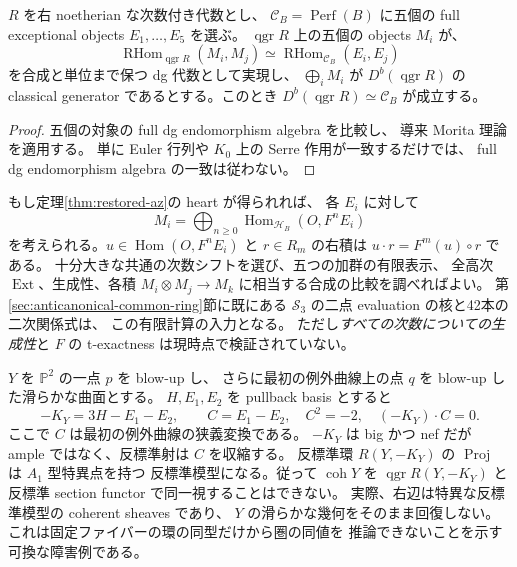 \begin{proposition}
$R$ を右 noetherian な次数付き代数とし、
$\mathcal C_B=\operatorname{Perf}(B)$ に五個の full exceptional objects
$E_1,\ldots,E_5$ を選ぶ。
$\operatorname{qgr}R$ 上の五個の objects $M_i$ が、
\[
\operatorname{RHom}_{\operatorname{qgr}R}(M_i,M_j)
 \simeq \operatorname{RHom}_{\mathcal C_B}(E_i,E_j)
\]
を合成と単位まで保つ dg 代数として実現し、
$\bigoplus_iM_i$ が $D^b(\operatorname{qgr}R)$ の classical generator
であるとする。このとき
$D^b(\operatorname{qgr}R)\simeq\mathcal C_B$ が成立する。
\end{proposition}
\begin{proof}
五個の対象の full dg endomorphism algebra を比較し、
導来 Morita 理論を適用する。
単に Euler 行列や $K_0$ 上の Serre 作用が一致するだけでは、
full dg endomorphism algebra の一致は従わない。
\end{proof}

\begin{remark}[再開時の有限入力]
もし定理\ref{thm:restored-az}の heart が得られれば、
各 $E_i$ に対して
\[
M_i=\bigoplus_{n\ge0}\operatorname{Hom}_{\mathcal H_B}(O,F^nE_i)
\]
を考えられる。$u\in\operatorname{Hom}(O,F^nE_i)$ と
$r\in R_m$ の右積は $u\cdot r=F^m(u)\circ r$ である。
十分大きな共通の次数シフトを選び、五つの加群の有限表示、
全高次 $\operatorname{Ext}$、生成性、各積 $M_i\otimes M_j\to M_k$
に相当する合成の比較を調べればよい。
第\ref{sec:anticanonical-common-ring}節に既にある
$\mathcal S_3$ の二点 evaluation の核と42本の二次関係式は、
この有限計算の入力となる。
ただし\emph{すべての次数についての生成性}と
$F$ の t-exactness は現時点で検証されていない。
\end{remark}

\begin{remark}[反標準環だけでは圏を復元できない例]\label{ex:restored-weak-dp}
$Y$ を $\mathbb P^2$ の一点 $p$ を blow-up し、
さらに最初の例外曲線上の点 $q$ を blow-up した滑らかな曲面とする。
$H,E_1,E_2$ を pullback basis とすると
\[
 -K_Y=3H-E_1-E_2,\qquad C=E_1-E_2,
 \quad C^2=-2,\quad (-K_Y)\cdot C=0.
\]
ここで $C$ は最初の例外曲線の狭義変換である。
$-K_Y$ は big かつ nef だが ample ではなく、反標準射は $C$ を収縮する。
反標準環 $R(Y,-K_Y)$ の $\operatorname{Proj}$ は $A_1$ 型特異点を持つ
反標準模型になる。従って
$\operatorname{coh}Y$ を $\operatorname{qgr}R(Y,-K_Y)$ と
反標準 section functor で同一視することはできない。
実際、右辺は特異な反標準模型の coherent sheaves であり、
$Y$ の滑らかな幾何をそのまま回復しない。
これは固定ファイバーの環の同型だけから圏の同値を
推論できないことを示す可換な障害例である。
\end{remark}
